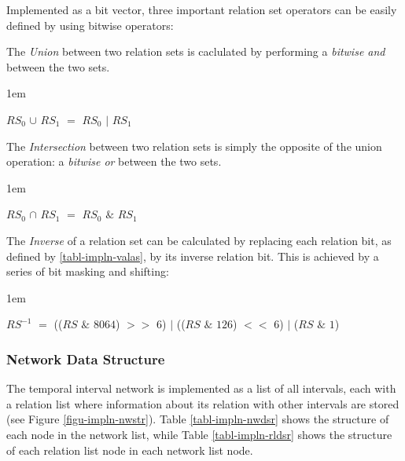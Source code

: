 \documentclass[11pt]{report}
\newenvironment{vquote}
{
  \begin{list}{}{\leftmargin 1em}\item[]
}
{
  \end{list}
}
\begin{document}
          Implemented as a bit vector, three important relation set operators
          can be easily defined by using bitwise operators:

          \begin{itemize}
            \item
              The {\em Union} between two relation sets is caclulated by
              performing a {\em bitwise and} between the two sets.

              \begin{vquote}
                $RS_0$ $\cup$ $RS_1$ $=$ $RS_0$ $|$ $RS_1$
              \end{vquote}

            \item
              The {\em Intersection} between two relation sets is simply the
              opposite of the union operation: a {\em bitwise or} between
              the two sets.

              \begin{vquote}
                $RS_0$ $\cap$ $RS_1$ $=$ $RS_0$ $\&$ $RS_1$
              \end{vquote}

            \item
              The {\em Inverse} of a relation set can be calculated by
              replacing each relation bit, as defined by
              \ref{tabl-impln-valas}, by its inverse relation bit. This
              is achieved by a series of bit masking and shifting:

              \begin{vquote}
                $RS^{-1}$ $=$
                  (($RS$ $\&$ $8064$) $>>$ $6$) $|$
                  (($RS$ $\&$ $126$)  $<<$ $6$) $|$
                  ($RS$ $\&$ $1$)
              \end{vquote}
          \end{itemize}

        \subsubsection{Network Data Structure}

          The temporal interval network is implemented as a list of all
          intervals, each with a relation list where information about its
          relation with other intervals are stored (see Figure
          \ref{figu-impln-nwstr}). Table \ref{tabl-impln-nwdsr} shows the
          structure of each node in the network list, while Table
          \ref{tabl-impln-rldsr} shows the structure of each relation list
          node in each network list node.
\end{document}

